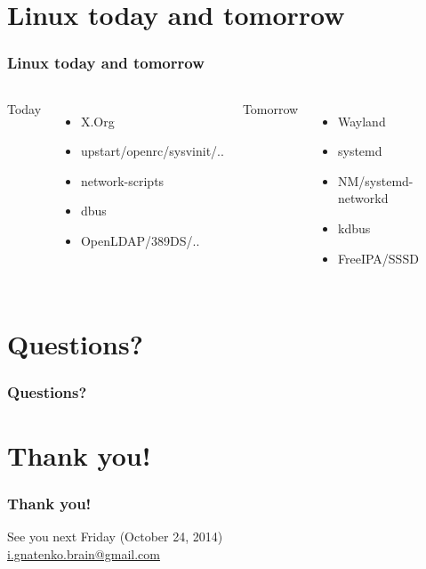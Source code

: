 \documentclass{beamer}
\begin{document}
\section{Linux today and tomorrow}
\begin{frame}
\frametitle<presentation>{Linux today and tomorrow}
\begin{columns}[c]
Today
\begin{itemize}
  \item X.Org
  \item upstart/openrc/sysvinit/..
  \item network-scripts 
  \item dbus
  \item OpenLDAP/389DS/..
\end{itemize}
Tomorrow
\begin{itemize}
  \item Wayland
  \item systemd
  \item NM/systemd-networkd
  \item kdbus
  \item FreeIPA/SSSD
\end{itemize}
\end{columns}
\end{frame}

\section*{Questions?}
\begin{frame}
\frametitle<presentation>{Questions?}
\end{frame}

\section*{Thank you!}
\begin{frame}
\frametitle<presentation>{Thank you!}

\begin{center}
See you next Friday (October 24, 2014)
\vfill
\MyAuthor\\
\href{mailto:i.gnatenko.brain@gmail.com}{i.gnatenko.brain@gmail.com}
\end{center}
\end{frame}
\end{document}
